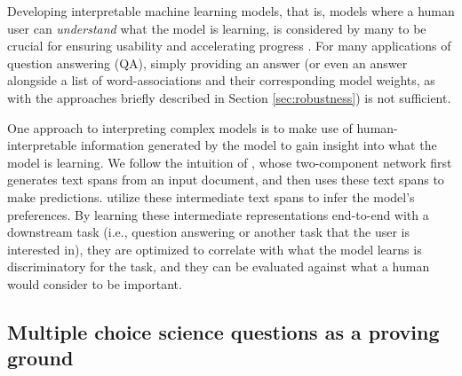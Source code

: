 Developing interpretable machine learning models, that is, models where a human user can \emph{understand} what the model is learning, is considered by many to be crucial for ensuring usability and accelerating progress \citep{craven1996extracting,Kim2015MindTG, letham2015interpretable, Ribeiro2016WhySI}.  
For many applications of question answering (QA), simply providing an answer (or even an answer alongside a list of word-associations and their corresponding model weights, as with the approaches briefly described in Section \ref{sec:robustness}) is not sufficient. 

One approach to interpreting complex models is to make use of human-interpretable information generated by the model to gain insight into what the model is learning.  
We follow the intuition of \citet{Lei2016RationalizingNP}, whose two-component network first generates text spans from an input document, and then uses these text spans to make predictions.   \citeauthor{Lei2016RationalizingNP} utilize these intermediate text spans to infer the model's preferences.
By learning these intermediate representations end-to-end with a downstream task (i.e., question answering or another task that the user is interested in), they are optimized to correlate with what the model learns is discriminatory for the task, and they can be evaluated against what a human would consider to be important.  

\subsection{Multiple choice science questions as a proving ground}
\label{sec:mcqa}

